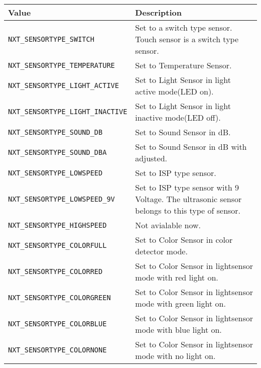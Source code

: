 \noindent
\begin{longtable}{p{5.5cm}p{10cm}}
    \hline
    Value &       Description\\
    \hline
    {\tt NXT\_SENSORTYPE\_SWITCH}        &Set to a switch type sensor. Touch 
    sensor is a switch type sensor.\\
    {\tt NXT\_SENSORTYPE\_TEMPERATURE}   &Set to Temperature Sensor.\\
    {\tt NXT\_SENSORTYPE\_LIGHT\_ACTIVE} &Set to Light Sensor in light active 
    mode(LED on).\\
    {\tt NXT\_SENSORTYPE\_LIGHT\_INACTIVE}&Set to Light Sensor in light inactive 
    mode(LED off).\\
    {\tt NXT\_SENSORTYPE\_SOUND\_DB}    &Set to Sound Sensor in dB.\\
    {\tt NXT\_SENSORTYPE\_SOUND\_DBA}   &Set to Sound Sensor in dB with adjusted.\\
    {\tt NXT\_SENSORTYPE\_LOWSPEED}     &Set to ISP type sensor.\\
    {\tt NXT\_SENSORTYPE\_LOWSPEED\_9V} &Set to ISP type sensor with 9 Voltage. 
    The ultrasonic sensor belongs to this type of sensor.\\
    {\tt NXT\_SENSORTYPE\_HIGHSPEED}     &Not avialable now.\\
    {\tt NXT\_SENSORTYPE\_COLORFULL}     &Set to Color Sensor in color detector mode.\\
    {\tt NXT\_SENSORTYPE\_COLORRED}      &Set to Color Sensor in lightsensor mode 
    with red light on.\\
    {\tt NXT\_SENSORTYPE\_COLORGREEN}    &Set to Color Sensor in lightsensor mode 
    with green light on.\\
    {\tt NXT\_SENSORTYPE\_COLORBLUE}     &Set to Color Sensor in lightsensor 
    mode with blue light on.\\
    {\tt NXT\_SENSORTYPE\_COLORNONE}     &Set to Color Sensor in lightsensor 
    mode with no light on.\\
    \hline
\end{longtable}

